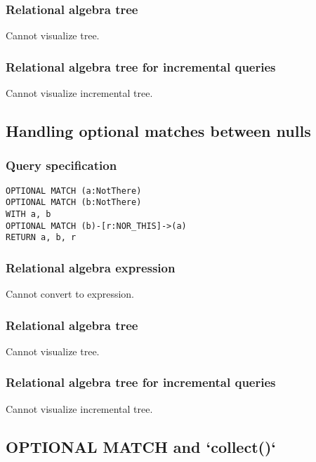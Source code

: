 \subsubsection*{Relational algebra tree}

Cannot visualize tree.

\subsubsection*{Relational algebra tree for incremental queries}

Cannot visualize incremental tree.

\subsection{Handling optional matches between nulls}

\subsubsection*{Query specification}

\begin{lstlisting}
OPTIONAL MATCH (a:NotThere)
OPTIONAL MATCH (b:NotThere)
WITH a, b
OPTIONAL MATCH (b)-[r:NOR_THIS]->(a)
RETURN a, b, r
\end{lstlisting}

\subsubsection*{Relational algebra expression}

Cannot convert to expression.

\subsubsection*{Relational algebra tree}

Cannot visualize tree.

\subsubsection*{Relational algebra tree for incremental queries}

Cannot visualize incremental tree.

\subsection{OPTIONAL MATCH and `collect()`}

